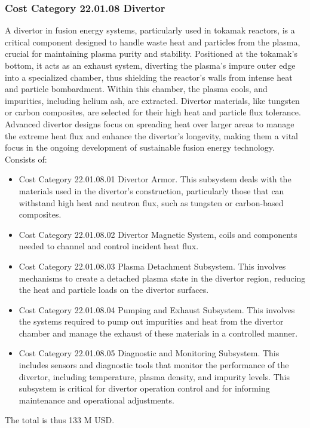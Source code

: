 \subsubsection*{Cost Category 22.01.08 Divertor}

A divertor in fusion energy systems, particularly used in tokamak reactors, is a critical component designed to handle waste heat and particles from the plasma, crucial for maintaining plasma purity and stability. Positioned at the tokamak's bottom, it acts as an exhaust system, diverting the plasma's impure outer edge into a specialized chamber, thus shielding the reactor's walls from intense heat and particle bombardment. Within this chamber, the plasma cools, and impurities, including helium ash, are extracted. Divertor materials, like tungsten or carbon composites, are selected for their high heat and particle flux tolerance. Advanced divertor designs focus on spreading heat over larger areas to manage the extreme heat flux and enhance the divertor's longevity, making them a vital focus in the ongoing development of sustainable fusion energy technology.\\

Consists of:

\begin{itemize}
    \item Cost Category 22.01.08.01 Divertor Armor. This subsystem deals with the materials used in the divertor's construction, particularly those that can withstand high heat and neutron flux, such as tungsten or carbon-based composites.

\item Cost Category 22.01.08.02 Divertor Magnetic System, coils and components needed to channel and control incident heat flux.

\item  Cost Category 22.01.08.03 Plasma Detachment Subsystem. This involves mechanisms to create a detached plasma state in the divertor region, reducing the heat and particle loads on the divertor surfaces. 


\item Cost Category 22.01.08.04 Pumping and Exhaust Subsystem. This involves the systems required to pump out impurities and heat from the divertor chamber and manage the exhaust of these materials in a controlled manner.

\item Cost Category 22.01.08.05 Diagnostic and Monitoring Subsystem. This includes sensors and diagnostic tools that monitor the performance of the divertor, including temperature, plasma density, and impurity levels. This subsystem is critical for divertor operation control and for informing maintenance and operational adjustments.
\end{itemize}

 The total is thus 133 M USD.
